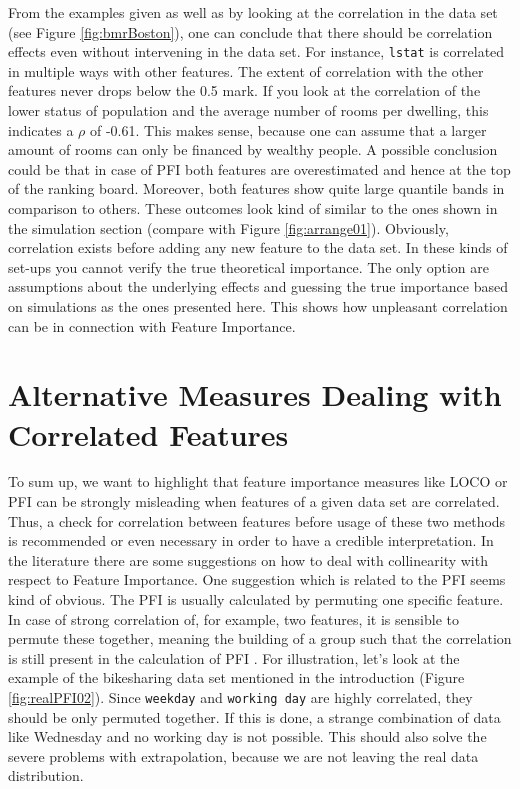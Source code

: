 \documentclass[]{krantz}
\begin{document}
From the examples given as well as by looking at the correlation in the
data set (see Figure \ref{fig:bmrBoston}), one can conclude that there
should be correlation effects even without intervening in the data set.
For instance, \texttt{lstat} is correlated in multiple ways with other
features. The extent of correlation with the other features never drops
below the 0.5 mark. If you look at the correlation of the lower status
of population and the average number of rooms per dwelling, this
indicates a \(\rho\) of -0.61. This makes sense, because one can assume
that a larger amount of rooms can only be financed by wealthy people. A
possible conclusion could be that in case of PFI both features are
overestimated and hence at the top of the ranking board. Moreover, both
features show quite large quantile bands in comparison to others. These
outcomes look kind of similar to the ones shown in the simulation
section (compare with Figure \ref{fig:arrange01}). Obviously,
correlation exists before adding any new feature to the data set. In
these kinds of set-ups you cannot verify the true theoretical
importance. The only option are assumptions about the underlying effects
and guessing the true importance based on simulations as the ones
presented here. This shows how unpleasant correlation can be in
connection with Feature Importance.

\section{Alternative Measures Dealing with Correlated
Features}\label{alternative-measures-dealing-with-correlated-features}

To sum up, we want to highlight that feature importance measures like
LOCO or PFI can be strongly misleading when features of a given data set
are correlated. Thus, a check for correlation between features before
usage of these two methods is recommended or even necessary in order to
have a credible interpretation. In the literature there are some
suggestions on how to deal with collinearity with respect to Feature
Importance. One suggestion which is related to the PFI seems kind of
obvious. The PFI is usually calculated by permuting one specific
feature. In case of strong correlation of, for example, two features, it
is sensible to permute these together, meaning the building of a group
such that the correlation is still present in the calculation of PFI
\citep{parr2018}. For illustration, let's look at the example of the
bikesharing data set mentioned in the introduction (Figure
\ref{fig:realPFI02}). Since \texttt{weekday} and \texttt{working\ day}
are highly correlated, they should be only permuted together. If this is
done, a strange combination of data like Wednesday and no working day is
not possible. This should also solve the severe problems with
extrapolation, because we are not leaving the real data distribution.
\end{document}

